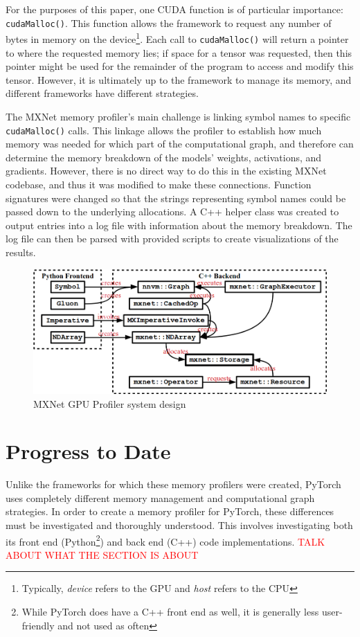 \documentclass[12pt,letterpaper]{article}
\newcommand\myworries[1]{\textcolor{red}{#1}}
\begin{document}
For the purposes of this paper, one CUDA function is of particular importance: \texttt{cudaMalloc()}. This function allows the framework to request any number of bytes in memory on the device\footnote{Typically, \textit{device} refers to the GPU and \textit{host} refers to the CPU}. Each call to \texttt{cudaMalloc()} will return a pointer to where the requested memory lies; if space for a tensor was requested, then this pointer might be used for the remainder of the program to access and modify this tensor. However, it is ultimately up to the framework to manage its memory, and different frameworks have different strategies. 
\par 

The MXNet memory profiler's main challenge is linking symbol names to specific \texttt{cudaMalloc()} calls. This linkage allows the profiler to establish how much memory was needed for which part of the computational graph, and therefore can determine the memory breakdown of the models' weights, activations, and gradients. However, there is no direct way to do this in the existing MXNet codebase, and thus it was modified to make these connections. Function signatures were changed so that the strings representing symbol names could be passed down to the underlying allocations. A C++ helper class was created to output entries into a log file with information about the memory breakdown. The log file can then be parsed with provided scripts to create visualizations of the results.
\par 

\begin{figure}[ht]
\centering
\includegraphics[width=.8\textwidth]{mxnet_profiler_design.png}
\captionsetup{width=0.7\linewidth}
\caption{MXNet GPU Profiler system design \cite{mxnet_profiler}}
\label{fig:mxnet_design}
\end{figure}

\section{Progress to Date}
\label{progress_to_date}
Unlike the frameworks for which these memory profilers were created, PyTorch uses completely different memory management and computational graph strategies. In order to create a memory profiler for PyTorch, these differences must be investigated and thoroughly understood. This involves investigating both its front end (Python\footnote{While PyTorch does have a C++ front end as well, it is generally less user-friendly and not used as often}) and back end (C++) code implementations. \myworries{TALK ABOUT WHAT THE SECTION IS ABOUT}
\end{document}
